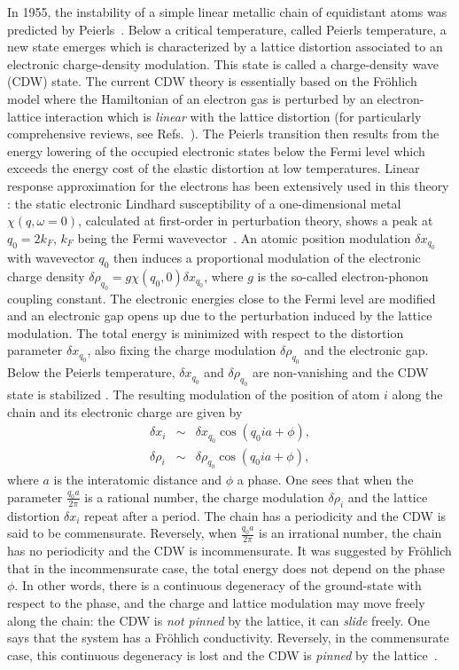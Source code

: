 \documentclass[]{revtex4-1}
\begin{document}
In 1955, the instability of a  simple linear metallic chain of equidistant atoms was predicted by Peierls~\cite{peierls}. Below a critical temperature, called Peierls temperature, a new state emerges  which is characterized by a lattice distortion associated to an electronic charge-density modulation. This state is called a charge-density wave (CDW) state. The current CDW theory is essentially based on the Fr\"ohlich model \cite{frohlich}  where the Hamiltonian of an electron gas is perturbed by an electron-lattice interaction which is \textit{linear} with the lattice distortion (for particularly comprehensive reviews, see Refs.~\cite{toombs, gruner_zettl}). The Peierls transition then results from the energy lowering of the occupied electronic states below the Fermi level which exceeds the energy cost of the elastic distortion at low temperatures. Linear response approximation for the electrons has been extensively used in this theory : the static electronic Lindhard susceptibility of a one-dimensional metal $\chi({q},\omega=0)$, calculated at first-order in perturbation theory, shows a peak at ${q_0}=2k_F$, $k_F$ being the Fermi wavevector~\cite{ashcroft}.  An atomic position modulation $\delta x_{{q_0}}$ with wavevector ${q_0}$ then induces a proportional modulation of the electronic charge density $ \delta \rho_{ q_0}=g\chi({ q_0},0) \delta x_{{q_0}}$, where $g$ is the so-called electron-phonon coupling constant. The electronic energies close to the Fermi level are modified and an electronic gap  opens up due to the perturbation induced by the lattice modulation. The total energy is minimized with respect to the distortion parameter $ \delta x_{q_0}$, also fixing the charge modulation $\delta \rho_{q_0}$ and the electronic gap. Below the Peierls temperature, $\delta x_{q_0}$ and $\delta \rho_{q_0}$ are non-vanishing and the CDW state is stabilized \cite{toombs,gruner_zettl}. The resulting modulation of the position of atom $i$ along the chain and its electronic charge are given by
\begin{eqnarray} \delta x_i & \sim & \delta x_{{q_0}} \cos{(q_0 i a + \phi)}, \\ \delta \rho_i & \sim & \delta \rho_{{q_0}} \cos{({q_0} i a + \phi)}, \end{eqnarray}  where $a$ is the interatomic distance and $\phi$ a phase. One sees that  when the parameter $\frac{q_0 a}{2\pi}$ is a rational number, the charge modulation $\delta \rho_i$ and the lattice distortion $\delta x_i$ repeat after a period. The chain has a periodicity and the CDW is said to be commensurate. Reversely, when $\frac{q_0 a}{2\pi}$ is an irrational number, the chain has no periodicity and the CDW is incommensurate. It was suggested by Fr\"ohlich \cite{frohlich} that in the incommensurate case, the total energy does not depend on the phase $\phi$. In other words, there is a continuous degeneracy of the ground-state with respect to the phase, and the charge and lattice modulation may move freely along the chain: the CDW is \textit{not pinned} by the lattice, it can \textit{slide} freely. One says that the system has a Fr\"ohlich conductivity. Reversely, in the commensurate case, this continuous degeneracy is lost and the CDW is \textit{pinned} by the lattice~\cite{LeeRiceAnderson}. 
\end{document}
